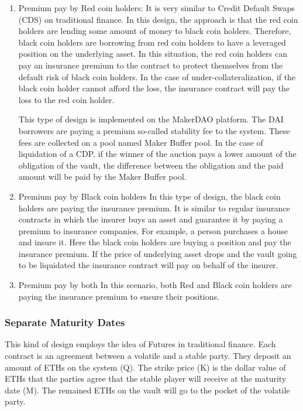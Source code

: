 \begin{enumerate}
	\item Premium pay by Red coin holders:
It is very similar to Credit Default Swaps (CDS) on traditional finance. In this design, the approach is that the red coin holders are lending some amount of money to black coin holders. Therefore, black coin holders are borrowing from red coin holders to have a leveraged position on the underlying asset. In this situation, the red coin holders can pay an insurance premium to the contract to protect themselves from the default risk of black coin holders. In the case of under-collateralization, if the black coin holder cannot afford the loss, the insurance contract will pay the loss to the red coin holder.

This type of design is implemented on the MakerDAO platform. The DAI borrowers are paying a premium so-called stability fee to the system. These fees are collected on a pool named Maker Buffer pool. In the case of liquidation of a CDP, if the winner of the auction pays a lower amount of the obligation of the vault, the difference between the obligation and the paid amount will be paid by the Maker Buffer pool.

	\item Premium pay by Black coin holders
In this type of design, the black coin holders are paying the insurance premium. It is similar to regular insurance contracts in which the insurer buys an asset and guarantee it by paying a premium to insurance companies. For example, a person purchases a house and insure it.
Here the black coin holders are buying a position and pay the insurance premium. If the price of underlying asset drops and the vault going to be liquidated the insurance contract will pay on behalf of the insurer.
	\item Premium pay by both
In this scenario, both Red and Black coin holders are paying the insurance premium to ensure their positions. 
\end{enumerate}

\subsubsection{Separate Maturity Dates}
This kind of design employs the idea of Futures in traditional finance. Each contract is an agreement between a volatile and a stable party. They deposit an amount of ETHs on the system (Q). The strike price (K) is the dollar value of ETHs that the parties agree that the stable player will receive at the maturity date (M). The remained ETHs on the vault will go to the pocket of the volatile party.


